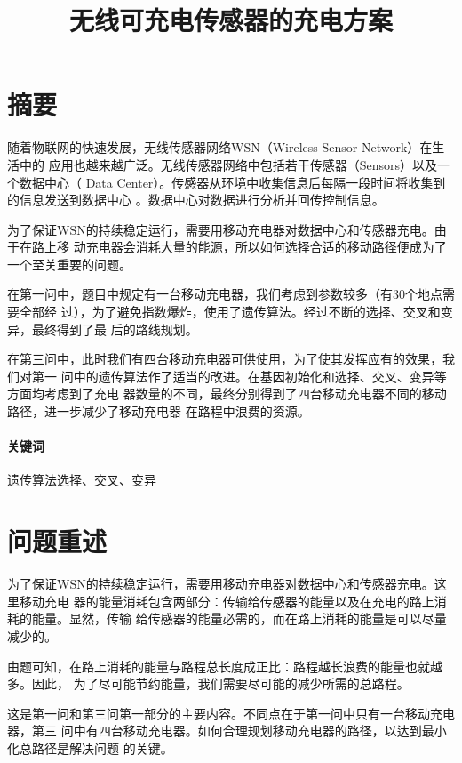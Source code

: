 \documentclass{ctexart}
\title{无线可充电传感器的充电方案}
\date{}
\begin{document}
    \maketitle

    \section*{摘要}
    随着物联网的快速发展，无线传感器网络WSN（Wireless Sensor Network）在生活中的
    应用也越来越广泛。无线传感器网络中包括若干传感器（Sensors）以及一个数据中心（
    Data Center）。传感器从环境中收集信息后每隔一段时间将收集到的信息发送到数据中心
    。数据中心对数据进行分析并回传控制信息。

    为了保证WSN的持续稳定运行，需要用移动充电器对数据中心和传感器充电。由于在路上移
    动充电器会消耗大量的能源，所以如何选择合适的移动路径便成为了一个至关重要的问题。
    
    在第一问中，题目中规定有一台移动充电器，我们考虑到参数较多（有30个地点需要全部经
    过），为了避免指数爆炸，使用了遗传算法。经过不断的选择、交叉和变异，最终得到了最
    后的路线规划。

    在第三问中，此时我们有四台移动充电器可供使用，为了使其发挥应有的效果，我们对第一
    问中的遗传算法作了适当的改进。在基因初始化和选择、交叉、变异等方面均考虑到了充电
    器数量的不同，最终分别得到了四台移动充电器不同的移动路径，进一步减少了移动充电器
    在路程中浪费的资源。
    
    \paragraph{关键词}遗传算法选择、交叉、变异
    \newpage

    \section{问题重述}
    为了保证WSN的持续稳定运行，需要用移动充电器对数据中心和传感器充电。这里移动充电
    器的能量消耗包含两部分：传输给传感器的能量以及在充电的路上消耗的能量。显然，传输
    给传感器的能量必需的，而在路上消耗的能量是可以尽量减少的。

    由题可知，在路上消耗的能量与路程总长度成正比：路程越长浪费的能量也就越多。因此，
    为了尽可能节约能量，我们需要尽可能的减少所需的总路程。

    这是第一问和第三问第一部分的主要内容。不同点在于第一问中只有一台移动充电器，第三
    问中有四台移动充电器。如何合理规划移动充电器的路径，以达到最小化总路径是解决问题
    的关键。
\end{document}
